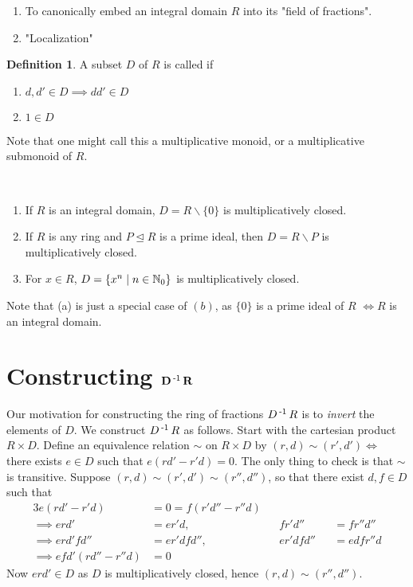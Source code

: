 \documentclass[11pt]{book}
\theoremstyle{definition}   \newtheorem{defn}[counter]{Definition} %
\newcommand{\bs}{\backslash}   \newcommand{\A}{\mathcal{A}}   \newcommand{\sy}{\textnormal{Syl}}   \newcommand{\size}[1]{\left| #1 \right|}
\newcommand{\nsg}{\mathrel{\unlhd}}   \newcommand{\ind}{\parindent24pt}   \newcommand{\vn}{\varnothing}
\newcommand{\vs}{\vspace{8pt}}
\numberwithin{counter}{chapter}
\begin{document}
\vs

\begin{enumerate}
\item[(1)] To canonically embed an integral domain $R$ into its "field of fractions".
\item[(2)] "Localization"
\end{enumerate}

\vs

\begin{defn}
A subset $D$ of $R$ is called  if
\begin{enumerate}
\item[(a)\ \ ] $d,d' \in D \implies dd' \in D$
\item[(b)*] $1 \in D$
\end{enumerate}
\end{defn}

Note that one might call this a multiplicative monoid, or a multiplicative submonoid of $R$.

\vs

\begin{example*}
\
\begin{enumerate}
\item[(a)] If $R$ is an integral domain, $D = R \bs \{0\}$ is multiplicatively closed.
\item[(b)] If $R$ is any ring and $P \nsg R$ is a prime ideal, then $D = R \bs P$ is multiplicatively closed.
\item[(c)] For $x \in R$, $D = \{x^n \mid n \in \operatorname{\mathbb{N}}_0\}$ is multiplicatively closed.
\end{enumerate}
\end{example*}

Note that (a) is just a special case of $(b)$, as $\{0\}$ is a prime ideal of $R$ $\iff R$ is an integral domain.

\vs

\section*{Constructing $\mathbf{D\operatorname{^{-1}} R}$}

\vs

Our motivation for constructing the ring of fractions $D\operatorname{^{-1}} R$ is to \emph{invert} the elements of $D$. We construct $D\operatorname{^{-1}} R$ as follows. Start with the cartesian product $R \times D$. Define an equivalence relation $\sim$ on $R \times D$ by $(r,d) \sim (r',d') \iff $ there exists $e \in D$ such that $e(rd' - r'd) = 0$. The only thing to check is that $\sim$ is transitive. Suppose $(r,d) \sim (r',d') \sim (r'',d'')$, so that there exist $d,f \in D$ such that
\begin{alignat*}{3}
e(rd'-r'd) &= 0 = f(r'd''-r''d) && && \\
\implies erd' &= er'd, \qquad && fr'd'' &&= fr''d'' \\
\implies erd'fd'' &= er'dfd'', \qquad && er'dfd'' &&= edfr''d \tag{multiply by $fd''$} \\
\implies efd'(rd''-r''d) &= 0 && &&
\end{alignat*}
Now $erd' \in D$ as $D$ is multiplicatively closed, hence $(r,d) \sim (r'',d'')$.
\end{document}
